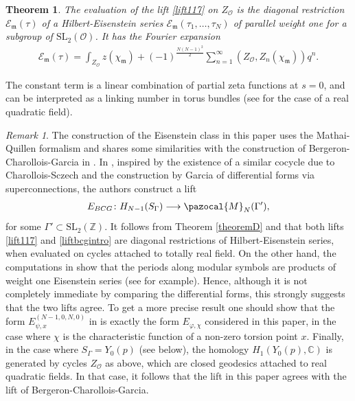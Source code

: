 \documentclass[a4paper,11pt]{amsart} %
\newcommand{\8}{\infty}
\newcommand{\Z}{\mathbb{Z}}
\newcommand{\SL}{\mathrm{SL}}
\newcommand{\Escr}{\mathscr{E}}
\newcommand{\C}{\mathbb{C}}
\newcommand{\m}{\mathfrak{m}}
\newcommand{\Ocal}{\mathcal{O}}
\newcommand{\Mcal}{\pazocal{M}}
\theoremstyle{mytheoremstyle}
\newtheorem{thm}{Theorem}[section]
\theoremstyle{remark}
\newtheorem{rmk}{Remark}[section]
\numberwithin{equation}{section}
\begin{document}
\begin{thm} \label{theoremE} The evaluation of the lift  \eqref{lift117} on $Z_\Ocal$ is the diagonal restriction $\Escr_{\m}(\tau)$ of a Hilbert-Eisenstein series $\Escr_{\m}(\tau_1, \dots,\tau_N)$ of parallel weight one for a subgroup of $\SL_2(\Ocal)$. It has the Fourier expansion
\begin{align}
\Escr_{\m}(\tau)=\int_{Z_\Ocal} z(\chi_\m)+(-1)^{\frac{N(N-1)^2}{2}}\sum_{n=1}^\8 (Z_\Ocal,Z_n(\chi_\m) ) q^n.
\end{align}
\end{thm}
The constant term is a linear combination of partial zeta functions at $s=0$, and can be interpreted as a linking number in torus bundles (see \cite{bergeronsmf} for the case of a real quadratic field). 

\begin{rmk} The construction of the Eisenstein class in this paper uses the Mathai-Quillen formalism and shares some similarities with the construction of Bergeron-Charollois-Garcia in \cite{bcg,bcgcrm}.  In \cite{bcg}, inspired by the existence of a similar cocycle due to Charollois-Sczech \cite{cs2016} and the construction by Garcia \cite{garcia} of differential forms via superconnections, the authors construct a lift
\begin{align} \label{liftbcgintro}
E_{BCG} \colon H_{N-1}(S_\Gamma) \longrightarrow \Mcal_N(\Gamma'),
\end{align}
for some $\Gamma' \subset \SL_2(\Z)$. It follows from Theorem \ref{theoremD} and \cite[Theorem.~6]{bcg} that both lifts \eqref{lift117} and \eqref{liftbcgintro} are diagonal restrictions of Hilbert-Eisenstein series, when evaluated on cycles attached to totally real field. On the other hand, the computations in \cite{bcgcrm} show that the periods along modular symbols are products of weight one Eisenstein series (see \cite[Théorème.~2.10]{bcgcrm} for example). Hence, although it is not completely immediate by comparing the differential forms, this strongly suggests that the two lifts agree. To get a more precise result one should show that the form $E_{\psi,x}^{(N-1,0,N,0)}$ in \cite[Lemma.~28]{bcg} is exactly the form $E_{\varphi, \chi}$ considered in this paper, in the case where $\chi$ is the characteristic function of a non-zero torsion point $x$. Finally, in the case where $S_\Gamma=Y_0(p)$ (see below), the homology $H_1(Y_0(p),\C)$ is generated by cycles $Z_\Ocal$ as above, which are closed geodesics attached to real quadratic fields. In that case, it follows that the lift in this paper agrees with the lift of Bergeron-Charollois-Garcia.
\end{rmk}
\end{document}
